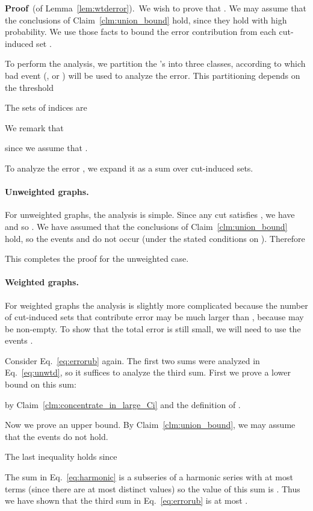 \documentclass[11pt]{article}
\newcommand{\proofbelow}{8pt}
\numberwithin{equation}{section}
\newenvironment{proofof}[1]{\noindent\textbf{Proof} \,(of #1).\,}{\afterproof}
\newcommand{\afterproof}{\hfill  \par \vspace{\proofbelow}}
\newcommand{\Claim}[1]{Claim~\ref{clm:#1}}
\newcommand{\Equation}[1]{Eq.~\eqref{eq:#1}}
\newcommand{\Lemma}[1]{Lemma~\ref{lem:#1}}
\begin{document}
\vspace{6pt}
\begin{proofof}{\Lemma{wtderror}}
We wish to prove that .
We may assume that the conclusions of \Claim{union_bound} hold,
since they hold with high probability.
We use those facts to bound the error contribution from each cut-induced set
.

To perform the analysis, we partition the 's into three classes,
according to which bad event (,  or )
will be used to analyze the error.
This partitioning depends on the threshold

The sets of indices are

We remark that

since we assume that .

To analyze the error , we expand it as a sum over cut-induced sets.


\paragraph{Unweighted graphs.}
For unweighted graphs, the analysis is simple.
Since any cut satisfies , we have  and so .
We have assumed that the conclusions of \Claim{union_bound} hold,
so the events  and  do not occur
(under the stated conditions on ).
Therefore

This completes the proof for the unweighted case.


\paragraph{Weighted graphs.}
For weighted graphs the analysis is slightly more complicated because
the number of cut-induced sets  that contribute error may be much larger than ,
because  may be non-empty.
To show that the total error is still small, we will need to use the events .

Consider \Equation{errorub} again.
The first two sums were analyzed in \Equation{unwtd},
so it suffices to analyze the third sum.
First we prove a lower bound on this sum:

by \Claim{concentrate_in_large_Ci} and the definition of .

Now we prove an upper bound.
By \Claim{union_bound}, we may assume that the events  do not hold.

The last inequality holds since

The sum in \Equation{harmonic} is a subseries of a harmonic series with at most  terms
(since there are at most  distinct  values)
so the value of this sum is .
Thus we have shown that the third sum in \Equation{errorub} is at most .
\end{proofof}
\end{document}
